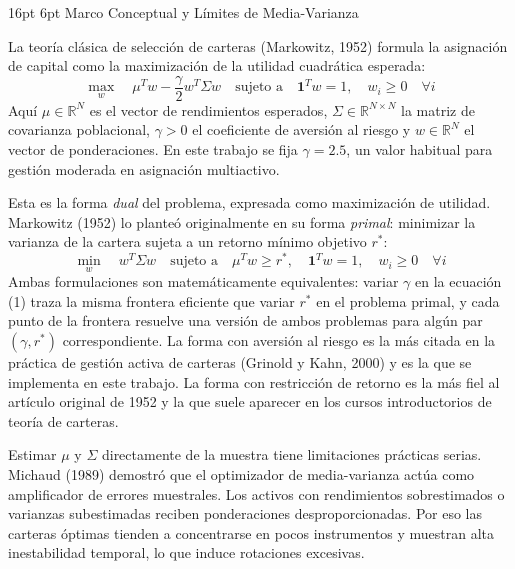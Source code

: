 \documentclass[11pt,a4paper]{article}
\makeatletter
\renewcommand\section{\@startsection{section}{1}{\z@}%
  {16pt \@plus 3pt \@minus 2pt}%
  {6pt}%
  {\centering\large\bfseries\color{navyblue}}}
\makeatother
\begin{document}
\vspace{0.5cm}


\section{Marco Conceptual y Límites de Media-Varianza}

La teoría clásica de selección de carteras (Markowitz, 1952) formula la asignación de capital como la maximización de la utilidad cuadrática esperada:
\begin{equation}
\max_{w} \quad \mu^T w - \frac{\gamma}{2} w^T \Sigma w \quad \text{sujeto a} \quad \mathbf{1}^T w = 1, \quad w_i \ge 0 \quad \forall i
\end{equation}
Aquí $\mu \in \mathbb{R}^N$ es el vector de rendimientos esperados, $\Sigma \in \mathbb{R}^{N \times N}$ la matriz de covarianza poblacional, $\gamma > 0$ el coeficiente de aversión al riesgo y $w \in \mathbb{R}^N$ el vector de ponderaciones. En este trabajo se fija $\gamma = 2.5$, un valor habitual para gestión moderada en asignación multiactivo.

Esta es la forma \textit{dual} del problema, expresada como maximización de utilidad. Markowitz (1952) lo planteó originalmente en su forma \textit{primal}: minimizar la varianza de la cartera sujeta a un retorno mínimo objetivo $r^*$:
\begin{equation*}
\min_{w} \quad w^T \Sigma w \quad \text{sujeto a} \quad \mu^T w \ge r^*, \quad \mathbf{1}^T w = 1, \quad w_i \ge 0 \quad \forall i
\end{equation*}
Ambas formulaciones son matemáticamente equivalentes: variar $\gamma$ en la ecuación (1) traza la misma frontera eficiente que variar $r^*$ en el problema primal, y cada punto de la frontera resuelve una versión de ambos problemas para algún par $(\gamma, r^*)$ correspondiente. La forma con aversión al riesgo es la más citada en la práctica de gestión activa de carteras (Grinold y Kahn, 2000) y es la que se implementa en este trabajo. La forma con restricción de retorno es la más fiel al artículo original de 1952 y la que suele aparecer en los cursos introductorios de teoría de carteras.

Estimar $\mu$ y $\Sigma$ directamente de la muestra tiene limitaciones prácticas serias. Michaud (1989) demostró que el optimizador de media-varianza actúa como amplificador de errores muestrales. Los activos con rendimientos sobrestimados o varianzas subestimadas reciben ponderaciones desproporcionadas. Por eso las carteras óptimas tienden a concentrarse en pocos instrumentos y muestran alta inestabilidad temporal, lo que induce rotaciones excesivas.
\end{document}
